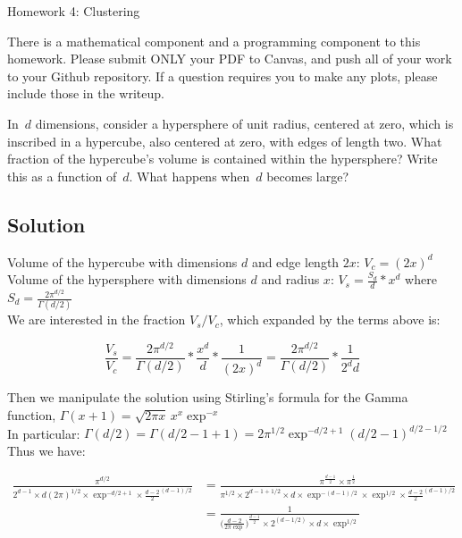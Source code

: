 \documentclass[submit]{harvardml}
\begin{document}
\begin{center}
{\Large Homework 4: Clustering}\\
\end{center}

There is a mathematical component and a programming component to this homework.
Please submit ONLY your PDF to Canvas, and push all of your work to your Github
repository. If a question requires you to make any plots, please
include those in the writeup.


\begin{problem}
In~$d$ dimensions, consider a hypersphere of unit radius, centered at zero,
which is inscribed in a hypercube, also centered at zero, with edges of length
two.  What fraction of the hypercube's volume is contained within the
hypersphere?  Write this as a function of~$d$.  What happens when~$d$ becomes
large?
\end{problem}
\subsection*{Solution}

Volume of the hypercube with dimensions $d$ and edge length $2x$: $V_c = (2x)^d$ \\
Volume of the hypersphere with dimensions $d$ and radius $x$: $V_s = \frac{S_d}{d} * x^d$ where $S_d = \frac{2\pi^{d/2}}{\Gamma(d/2)}$ \\ 

\noindent
We are interested in the fraction $V_s / V_c$, which expanded by the terms above is:

\[
\frac{V_s}{V_c} = \frac{2\pi^{d/2}}{\Gamma(d/2)} * \frac{x^d}{d} * \frac{1}{(2x)^d} = \frac{2\pi^{d/2}}{\Gamma(d/2)} * \frac{1}{2^dd}
\]

\noindent
Then we manipulate the solution using Stirling's formula for the Gamma function, $\Gamma \left({x + 1}\right) = \sqrt {2 \pi x} \, x^x \exp^{-x}$ \\

In particular: $\Gamma(d/2) = \Gamma(d/2-1+1) = 2\pi^{1/2}\exp^{-d/2+1}(d/2-1)^{d/2-1/2}$ \\

\noindent
Thus we have:

\begin{align*}
\frac{\pi^{d/2}}{2^{d-1}\times d(2\pi)^{1/2} \times \exp^{-d/2+1} \times \frac{d-2}{2}^{(d-1)/2}} & =
\frac{\pi^\frac{d-1}{2} \times \pi^\frac{1}{2}}{\pi^{1/2} \times 2^{d-1+1/2} \times d \times \exp^{-(d-1)/2} \times \exp^{1/2} \times \frac{d-2}{2}^{(d-1)/2}} \\
& = \frac{1}{\big(\frac{d-2}{2\pi\exp}\big)^\frac{d-1}{2} \times 2^{(d-1/2)} \times d \times \exp^{1/2}}
\end{align*}
\end{document}
